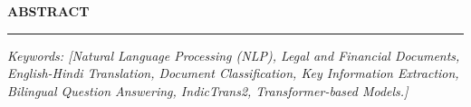 \thispagestyle{empty}

\begin{center}
{\Large {\bf \uppercase{ABSTRACT}}}
\end{center}

\vspace{\baselineskip}
\hrule
\vspace{2\baselineskip}


\textit{Keywords: [Natural Language Processing (NLP), Legal and Financial Documents, English-Hindi Translation, Document Classification, Key Information Extraction, Bilingual Question Answering, IndicTrans2, Transformer-based Models.]}


